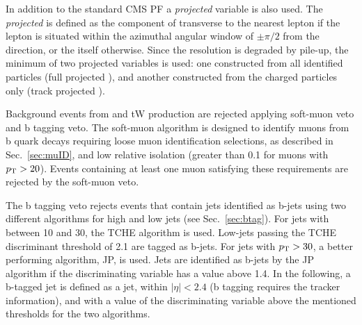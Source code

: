 In addition to the standard CMS PF \MET a \textit{projected} \MET variable is also used. The \textit{projected} \MET is defined as the component of \ptmiss transverse to the nearest lepton if the lepton is situated within the azimuthal angular window of $\pm \pi/2$ from the \ptmiss direction, or the \MET itself otherwise.
Since the \MET resolution is degraded by pile-up, the minimum of two projected \MET variables is used: one constructed from all identified particles (full projected \MET), and another constructed from the charged particles only (track projected \MET).

Background events from \ttbar and tW production are rejected applying soft-muon veto and b tagging veto. The soft-muon algorithm is designed to identify muons from b quark decays requiring loose muon identification selections, as described in Sec.~\ref{sec:muID}, and low relative isolation (greater than 0.1 for muons with $p_\mathrm{T}>20$\GeV). Events containing at least one muon satisfying these requirements are rejected by the soft-muon veto.

The b tagging veto rejects events that contain jets identified as b-jets using two different algorithms for high and low \pt jets (see Sec.~\ref{sec:btag}). For jets with \pt between 10 and 30\GeV, the TCHE algorithm is used. Low-\pt jets passing the TCHE discriminant threshold of 2.1 are tagged as b-jets.
For jets with $p_\mathrm{T}>30$\GeV, a better performing algorithm, JP, is used. Jets are identified as b-jets by the JP algorithm if the discriminating variable has a value above 1.4.
In the following, a b-tagged jet is defined as a jet, within $|\eta|<2.4$ (b tagging requires the tracker information), and with a value of the discriminating variable above the mentioned thresholds for the two algorithms.

